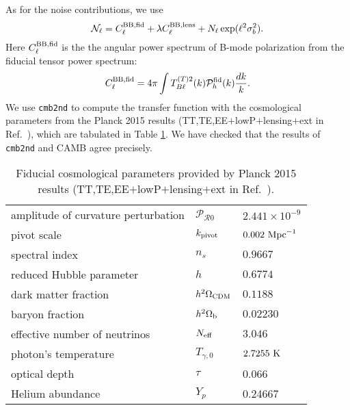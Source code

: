 \documentclass[tightenlines,floats,aps,nofootinbib,prd,onecolumn,preprintnumbers]{revtex4}
\newcommand{\PP}{\mathcal{P}}
\newcommand{\calR}{\mathcal{R}}
\begin{document}
As for the noise contributions, we use
%
\begin{equation}
  \mathcal{N}_\ell = C_\ell^{\rm BB,fid} + \lambda C_\ell^{\rm BB,lens} + N_\ell\exp(\ell^2\sigma_b^2).
 \label{eq:noise}
\end{equation}
%
Here $C_\ell^{\rm BB,fid}$ is the the angular power spectrum
of B-mode polarization from the fiducial tensor power spectrum:
%
\begin{equation}
 C_\ell^{\rm BB,fid} = 4\pi\int T_{B\ell}^{(T)2}(k)\PP_h^{\rm fid}(k)\frac{dk}{k}.
\end{equation}
%
We use {\tt cmb2nd} \cite{Hiramatsu} to compute the transfer function
with the cosmological parameters from the Planck 2015 results
(TT,TE,EE$+$lowP$+$lensing$+$ext in Ref.~\cite{Ade:2015xua}), which are
tabulated in Table \ref{tab:param}. We have checked that the results of
{\tt cmb2nd} and CAMB agree precisely.

\begin{table}[!ht]
\centering
\begin{tabular}{lll}
\hline
amplitude of curvature perturbation & $\PP_{\calR 0}$ & $2.441\times 10^{-9}$ \\
pivot scale                         & $k_{\rm pivot}$ & $0.002~{\rm Mpc}^{-1}$ \\
spectral index                      & $n_s$           & $0.9667$ \\
reduced Hubble parameter            & $h$             & $0.6774$ \\
dark matter fraction                & $h^2\Omega_{\rm CDM}$ & $0.1188$ \\
baryon fraction                     & $h^2\Omega_{\rm b}$   & $0.02230$ \\
effective number of neutrinos       & $N_{\rm eff}$         & $3.046$ \\
photon's temperature                & $T_{\gamma,0}$        & $2.7255~{\rm K}$ \\
optical depth                       & $\tau$                & 0.066 \\
Helium abundance                    & $Y_p$                 & 0.24667 \\
\hline
\end{tabular} 
 \caption{Fiducial cosmological parameters provided by Planck 2015 results
(TT,TE,EE$+$lowP$+$lensing$+$ext in Ref.~\cite{Ade:2015xua}).}
 \label{tab:param}
\end{table}
\end{document}
